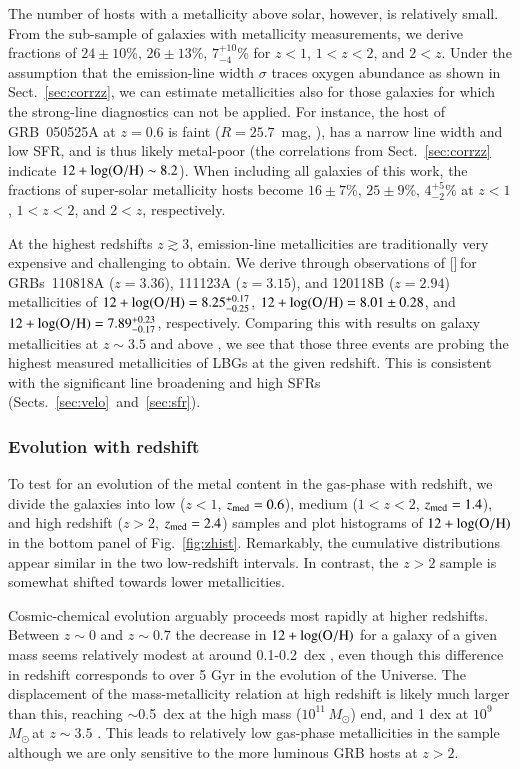 \documentclass[traditabstract, longauth]{aa}
\newcommand{\oh}{12+\log(\rm{O/H})}
\newcommand{\neiii}{[\ion{Ne}{iii}]}
\newcommand{\Msun}{$M_\odot$}
\begin{document}
{The number of hosts with a metallicity above solar, however, is relatively small. From the sub-sample of galaxies with metallicity measurements, we derive fractions of $24\pm 10$\%, $26\pm 13$\%, $7_{-4}^{+10}$\% for $z<1$, $1<z<2$, and $2<z$. Under the assumption that the emission-line width $\sigma$ traces oxygen abundance as shown in Sect.~\ref{sec:corrzz}, we can estimate metallicities also for those galaxies for which the strong-line diagnostics can not be applied. For instance, the host of GRB~050525A at $z=0.6$ is faint ($R=25.7$~mag, \citealp{2012ApJ...756..187H}), has a narrow line width and low SFR, and is thus likely metal-poor (the correlations from Sect.~\ref{sec:corrzz} indicate $\oh\sim8.2$). When including all galaxies of this work, the fractions of super-solar metallicity hosts become $16\pm7$\%, $25\pm9$\%, $4_{-2}^{+5}$\% at $z<1$, $1<z<2$, and $2<z$, respectively.}

At the highest redshifts $z\gtrsim3$, emission-line metallicities are traditionally very expensive and challenging to obtain. We derive through observations of \neiii\,for GRBs~110818A ($z=3.36$), 111123A ($z=3.15$), and 120118B ($z=2.94$) metallicities of $\oh=8.25_{-0.25}^{+0.17}$, $\oh=8.01\pm0.28$, and $\oh=7.89_{-0.17}^{+0.23}$, respectively. Comparing this with results on galaxy metallicities at $z\sim3.5$ and above \citep{2008A&A...488..463M, 2011ApJ...739....1L}, we see that those three events are probing the highest measured metallicities of LBGs at the given redshift. This is consistent with the significant line broadening and high SFRs (Sects.~\ref{sec:velo}~and~\ref{sec:sfr}).


\subsubsection{Evolution with redshift}

To test for an evolution of the metal content in the gas-phase with redshift, we divide the galaxies into low ($z<1$, $z_{\rm{med}}=0.6$), medium ($1<z<2$, $z_{\rm{med}}=1.4$), and high redshift ($z>2$, $z_{\rm{med}} = 2.4$) samples and plot histograms of $\oh$ in the bottom panel of Fig.~\ref{fig:zhist}. Remarkably, the cumulative distributions appear similar in the two low-redshift intervals. In contrast, the $z>2$ sample is somewhat shifted towards lower metallicities.

Cosmic-chemical evolution arguably proceeds most rapidly at higher redshifts. Between $z\sim0$ and $z\sim0.7$ the decrease in $\oh$ for a galaxy of a given mass seems relatively modest at around 0.1-0.2~dex \citep{2004ApJ...613..898T, 2005ApJ...635..260S}, even though this difference in redshift corresponds to over 5 Gyr in the evolution of the Universe. The displacement of the mass-metallicity relation at high redshift is likely much larger than this, reaching $\sim$0.5~dex at the high mass ($10^{11}$\,\Msun) end, and 1 dex at $10^{9}$\,\Msun\,at $z\sim3.5$ \citep{2008A&A...488..463M, 2014A&A...563A..58T}. This leads to relatively low gas-phase metallicities in the sample although we are only sensitive to the more luminous GRB hosts at $z>2$.
\end{document}
